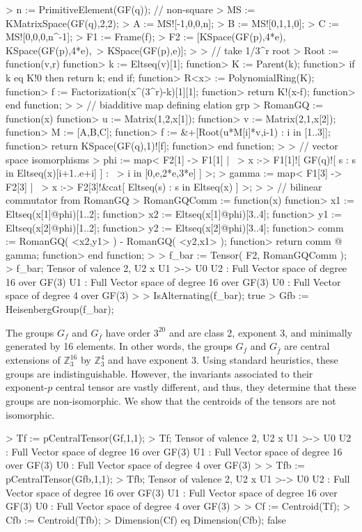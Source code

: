 \begin{example}
\begin{code}
> n := PrimitiveElement(GF(q)); // non-square
> MS := KMatrixSpace(GF(q),2,2);
> A := MS![-1,0,0,n];
> B := MS![0,1,1,0];
> C := MS![0,0,0,n^-1];
> F1 := Frame(f);
> F2 := [KSpace(GF(p),4*e), KSpace(GF(p),4*e),\
>   KSpace(GF(p),e)];
> 
> // take 1/3^r root
> Root := function(v,r) 
function>   k := Eltseq(v)[1];
function>   K := Parent(k);
function>   if k eq K!0 then return k; end if;
function>   R<x> := PolynomialRing(K);
function>   f := Factorization(x^(3^r)-k)[1][1];
function>   return K!(x-f);
function> end function;
> 
> // biadditive map defining elation grp
> RomanGQ := function(x) 
function>   u := Matrix(1,2,x[1]);
function>   v := Matrix(2,1,x[2]);
function>   M := [A,B,C];
function>   f := &+[Root(u*M[i]*v,i-1) : i in [1..3]];
function>   return KSpace(GF(q),1)![f];
function> end function;
> 
> // vector space isomorphisms
> phi := map< F2[1] -> F1[1] | \
>   x :-> F1[1]![ GF(q)![ s : s in Eltseq(x)[i+1..e+i] ] : \
>     i in [0,e,2*e,3*e] ] >;
> gamma := map< F1[3] -> F2[3] | \
>   x :-> F2[3]!&cat[ Eltseq(s) : s in Eltseq(x) ] >;
> 
> // bilinear commutator from RomanGQ
> RomanGQComm := function(x)
function>   x1 := Eltseq(x[1]@phi)[1..2];
function>   x2 := Eltseq(x[1]@phi)[3..4];
function>   y1 := Eltseq(x[2]@phi)[1..2];
function>   y2 := Eltseq(x[2]@phi)[3..4];
function>   comm := RomanGQ( <x2,y1> ) - RomanGQ( <y2,x1> );
function>   return comm @ gamma;
function> end function;
> 
> f_bar := Tensor( F2, RomanGQComm );
> f_bar;
Tensor of valence 2, U2 x U1 >-> U0
U2 : Full Vector space of degree 16 over GF(3)
U1 : Full Vector space of degree 16 over GF(3)
U0 : Full Vector space of degree 4 over GF(3)
> 
> IsAlternating(f_bar);
true
> Gfb := HeisenbergGroup(f_bar);
\end{code}

The groups $G_f$ and $G_{\bar{f}}$ have order $3^{20}$ and are class 2, exponent
3, and minimally generated by 16 elements. In other words, the groups $G_f$ and
$G_{\bar{f}}$ are central extensions of $\mathbb{Z}_3^{16}$ by
$\mathbb{Z}_3^{4}$ and have exponent $3$. Using standard heuristics, these
groups are indistinguishable. However, the invariants associated to their
exponent-$p$ central tensor are vastly different, and thus, they determine that
these groups are non-isomorphic. We show that the centroids of the tensors are
not isomorphic.

\begin{code}
> Tf := pCentralTensor(Gf,1,1);
> Tf;
Tensor of valence 2, U2 x U1 >-> U0
U2 : Full Vector space of degree 16 over GF(3)
U1 : Full Vector space of degree 16 over GF(3)
U0 : Full Vector space of degree 4 over GF(3)
> 
> Tfb := pCentralTensor(Gfb,1,1);
> Tfb;
Tensor of valence 2, U2 x U1 >-> U0
U2 : Full Vector space of degree 16 over GF(3)
U1 : Full Vector space of degree 16 over GF(3)
U0 : Full Vector space of degree 4 over GF(3)
> 
> Cf := Centroid(Tf);
> Cfb := Centroid(Tfb);
> Dimension(Cf) eq Dimension(Cfb);
false
\end{code}
\end{example}

